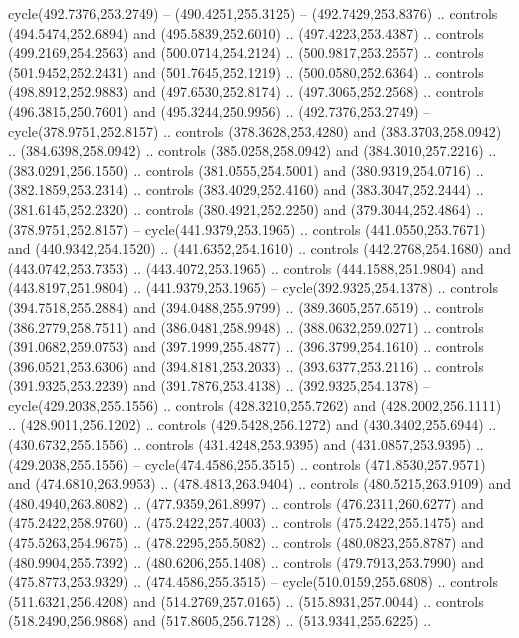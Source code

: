 \begin{scope}[cm={{1.25,0.0,0.0,-1.25,(0.0,743.43331)}}]
    cycle(492.7376,253.2749) -- (490.4251,255.3125) -- (492.7429,253.8376) ..
    controls (494.5474,252.6894) and (495.5839,252.6010) .. (497.4223,253.4387) ..
    controls (499.2169,254.2563) and (500.0714,254.2124) .. (500.9817,253.2557) ..
    controls (501.9452,252.2431) and (501.7645,252.1219) .. (500.0580,252.6364) ..
    controls (498.8912,252.9883) and (497.6530,252.8174) .. (497.3065,252.2568) ..
    controls (496.3815,250.7601) and (495.3244,250.9956) .. (492.7376,253.2749) --
    cycle(378.9751,252.8157) .. controls (378.3628,253.4280) and
    (383.3703,258.0942) .. (384.6398,258.0942) .. controls (385.0258,258.0942) and
    (384.3010,257.2216) .. (383.0291,256.1550) .. controls (381.0555,254.5001) and
    (380.9319,254.0716) .. (382.1859,253.2314) .. controls (383.4029,252.4160) and
    (383.3047,252.2444) .. (381.6145,252.2320) .. controls (380.4921,252.2250) and
    (379.3044,252.4864) .. (378.9751,252.8157) -- cycle(441.9379,253.1965) ..
    controls (441.0550,253.7671) and (440.9342,254.1520) .. (441.6352,254.1610) ..
    controls (442.2768,254.1680) and (443.0742,253.7353) .. (443.4072,253.1965) ..
    controls (444.1588,251.9804) and (443.8197,251.9804) .. (441.9379,253.1965) --
    cycle(392.9325,254.1378) .. controls (394.7518,255.2884) and
    (394.0488,255.9799) .. (389.3605,257.6519) .. controls (386.2779,258.7511) and
    (386.0481,258.9948) .. (388.0632,259.0271) .. controls (391.0682,259.0753) and
    (397.1999,255.4877) .. (396.3799,254.1610) .. controls (396.0521,253.6306) and
    (394.8181,253.2033) .. (393.6377,253.2116) .. controls (391.9325,253.2239) and
    (391.7876,253.4138) .. (392.9325,254.1378) -- cycle(429.2038,255.1556) ..
    controls (428.3210,255.7262) and (428.2002,256.1111) .. (428.9011,256.1202) ..
    controls (429.5428,256.1272) and (430.3402,255.6944) .. (430.6732,255.1556) ..
    controls (431.4248,253.9395) and (431.0857,253.9395) .. (429.2038,255.1556) --
    cycle(474.4586,255.3515) .. controls (471.8530,257.9571) and
    (474.6810,263.9953) .. (478.4813,263.9404) .. controls (480.5215,263.9109) and
    (480.4940,263.8082) .. (477.9359,261.8997) .. controls (476.2311,260.6277) and
    (475.2422,258.9760) .. (475.2422,257.4003) .. controls (475.2422,255.1475) and
    (475.5263,254.9675) .. (478.2295,255.5082) .. controls (480.0823,255.8787) and
    (480.9904,255.7392) .. (480.6206,255.1408) .. controls (479.7913,253.7990) and
    (475.8773,253.9329) .. (474.4586,255.3515) -- cycle(510.0159,255.6808) ..
    controls (511.6321,256.4208) and (514.2769,257.0165) .. (515.8931,257.0044) ..
    controls (518.2490,256.9868) and (517.8605,256.7128) .. (513.9341,255.6225) ..

\end{scope}
